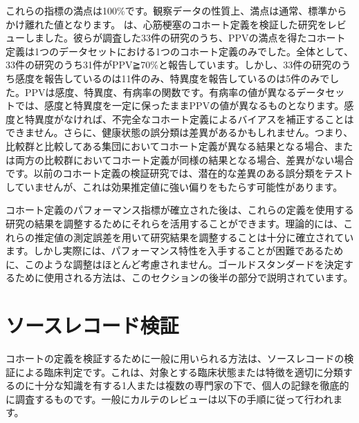 \documentclass[
  11pt]{book}
\theoremstyle{definition}
\theoremstyle{definition}
\theoremstyle{definition}
\theoremstyle{definition}
\theoremstyle{remark}
\begin{document}
これらの指標の満点は100\%です。観察データの性質上、満点は通常、標準からかけ離れた値となります。 \citet{Rubbo2015phenotypes} は、心筋梗塞のコホート定義を検証した研究をレビューしました。彼らが調査した33件の研究のうち、PPVの満点を得たコホート定義は1つのデータセットにおける1つのコホート定義のみでした。全体として、33件の研究のうち31件がPPV≧70\%と報告しています。しかし、33件の研究のうち感度を報告しているのは11件のみ、特異度を報告しているのは5件のみでした。PPVは感度、特異度、有病率の関数です。有病率の値が異なるデータセットでは、感度と特異度を一定に保ったままPPVの値が異なるものとなります。感度と特異度がなければ、不完全なコホート定義によるバイアスを補正することはできません。さらに、健康状態の誤分類は差異があるかもしれません。つまり、比較群と比較してある集団においてコホート定義が異なる結果となる場合、または両方の比較群においてコホート定義が同様の結果となる場合、差異がない場合です。以前のコホート定義の検証研究では、潜在的な差異のある誤分類をテストしていませんが、これは効果推定値に強い偏りをもたらす可能性があります。

コホート定義のパフォーマンス指標が確立された後は、これらの定義を使用する研究の結果を調整するためにそれらを活用することができます。理論的には、これらの推定値の測定誤差を用いて研究結果を調整することは十分に確立されています。しかし実際には、パフォーマンス特性を入手することが困難であるために、このような調整はほとんど考慮されません。ゴールドスタンダードを決定するために使用される方法は、このセクションの後半の部分で説明されています。

\section{ソースレコード検証}\label{ux30bdux30fcux30b9ux30ecux30b3ux30fcux30c9ux691cux8a3c}


コホートの定義を検証するために一般に用いられる方法は、ソースレコードの検証による臨床判定です。これは、対象とする臨床状態または特徴を適切に分類するのに十分な知識を有する1人または複数の専門家の下で、個人の記録を徹底的に調査するものです。一般にカルテのレビューは以下の手順に従って行われます。
\end{document}
